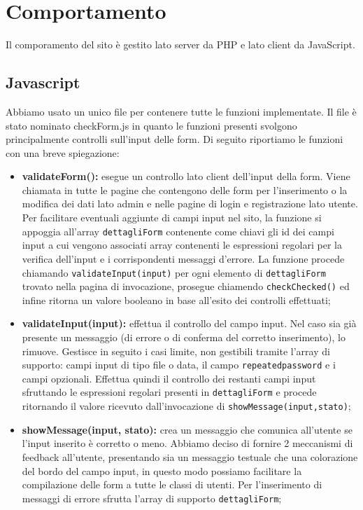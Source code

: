 \section{Comportamento}
Il comporamento del sito è gestito lato server da PHP e lato client da JavaScript.

\subsection{Javascript}
Abbiamo usato un unico file per contenere tutte le funzioni implementate. Il file è stato nominato checkForm.js in quanto le funzioni presenti svolgono principalmente controlli sull'input delle form.
Di seguito riportiamo le funzioni con una breve spiegazione:

\begin{itemize}
	\item \textbf{validateForm(): } esegue un controllo lato client dell'input della form. Viene chiamata in tutte le pagine che contengono delle form per l'inserimento o la modifica dei dati lato admin e nelle pagine di login e registrazione lato utente.
	Per facilitare eventuali aggiunte di campi input nel sito, la funzione si appoggia all'array \texttt{dettagliForm} contenente come chiavi gli id dei campi input a cui vengono associati array contenenti le espressioni regolari per la verifica dell'input e i corrispondenti messaggi d'errore.
	La funzione procede chiamando \texttt{validateInput(input)} per ogni elemento di \texttt{dettagliForm} trovato nella pagina di invocazione, prosegue chiamendo \texttt{checkChecked()} ed infine ritorna un valore booleano in base all'esito dei controlli effettuati; \\

	\item \textbf{validateInput(input): } effettua il controllo del campo input. Nel caso sia già presente un messaggio (di errore o di conferma del corretto inserimento), lo rimuove. Gestisce in seguito i casi limite, non gestibili tramite l'array di supporto: campi input di tipo file o data, il campo \texttt{repeatedpassword} e i campi opzionali. Effettua quindi il controllo dei restanti campi input sfruttando le espressioni regolari presenti in \texttt{dettagliForm} e procede ritornando il valore ricevuto dall'invocazione di \texttt{showMessage(input,stato)}; \\

	\item \textbf{showMessage(input, stato): } crea un messaggio che comunica all'utente se l'input inserito è corretto o meno. Abbiamo deciso di fornire 2 meccanismi di feedback all'utente, presentando sia un messaggio testuale che una colorazione del bordo del campo input, in questo modo possiamo facilitare la compilazione delle form a tutte le classi di utenti. Per l'inserimento di messaggi di errore sfrutta l'array di supporto \texttt{dettagliForm}; \\


\end{itemize}

